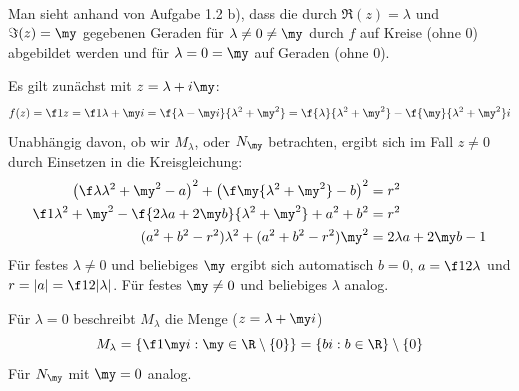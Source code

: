 \documentclass[a4paper]{scrartcl}
\begin{document}
	\setcounter{section}{1}
	\begin{aufgabe}~

		Man sieht anhand von Aufgabe 1.2 b), dass die durch $\Re(z)=\lambda$ und $\Im(z)=\my$ gegebenen Geraden für $\lambda\neq0\neq\my$ durch $f$ auf Kreise (ohne $0$) abgebildet werden und für $\lambda=0=\my$ auf Geraden (ohne $0$).

		Es gilt zunächst mit $z=\lambda + i\my$:
		\[
			f(z) = \f 1z = \f 1{\lambda+\my i} = \f {\lambda -\my i}{\lambda^2+\my^2}= \f{\lambda}{\lambda^2+\my^2} - \f{\my}{\lambda^2+\my^2}i
		\]
		Unabhängig davon, ob wir $M_\lambda$, oder $N_\my$ betrachten, ergibt sich im Fall $z\neq 0$ durch Einsetzen in die Kreisgleichung:
		\begin{align*}
			\left(\f \lambda{\lambda^2+\my^2}-a\right)^2 + \left(\f \my{\lambda^2+\my^2}-b\right)^2&=r^2\\
			   \f 1{\lambda^2+\my^2} - \f {2\lambda a+2\my b}{\lambda^2 +\my^2} + a^2 + b^2 &= r^2\\
												(a^2+b^2-r^2)\lambda^2 + (a^2+b^2-r^2)\my^2 &= 2\lambda a + 2\my b - 1
		\end{align*}
		Für festes $\lambda\neq 0$ und beliebiges $\my$ ergibt sich automatisch $b=0$, $a=\f 1{2\lambda}$ und $r=|a|=\f1{2|\lambda|}$. Für festes $\my\neq 0$ und beliebiges $\lambda$ analog.

		Für $\lambda=0$ beschreibt $M_\lambda$ die Menge ($z=\lambda+\my i$)
		\[
			M_\lambda = \left\{\f 1{\my i} : \my\in \R\setminus \{0\}\right\} = \{ b i : b\in \R\} \setminus \{0\}
		\]
		Für $N_\my$ mit $\my=0$ analog.


\end{aufgabe}
\end{document}
